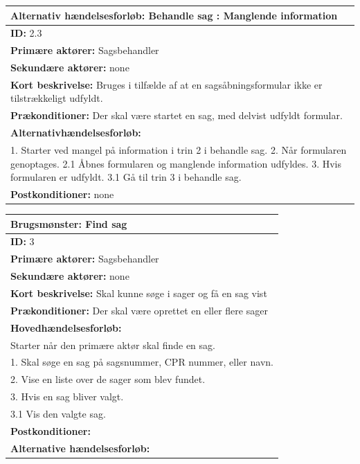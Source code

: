 \begin{center} \label{tab:2.3}
\begin{longtable}{|p{18cm}|}
\hline
\textbf{Alternativ hændelsesforløb:} Behandle sag : Manglende information\\
\hline
\textbf{ID:} 2.3 \\
\hline
\textbf{Primære aktører:} Sagsbehandler\\
\hline
\textbf{Sekundære aktører:} none \\
\hline
\textbf{Kort beskrivelse: }Bruges i tilfælde af at en sagsåbningsformular ikke er tilstrækkeligt udfyldt.
\\
\hline
\textbf{Prækonditioner: }Der skal være startet en sag, med delvist udfyldt formular. 
\\
\hline
\textbf{Alternativhændelsesforløb:}\\
1. Starter ved mangel på information i trin 2 i behandle sag.
2. Når formularen genoptages.
2.1 Åbnes formularen og manglende information udfyldes. 
3. Hvis formularen er udfyldt.
3.1 Gå til trin 3 i behandle sag.

\\
\hline
\textbf{Postkonditioner:} none\\
\hline
\end{longtable}
\end{center}

\begin{center} \label{tab:3}
\begin{longtable}{|p{18cm}|}
\hline
\textbf{Brugsmønster: }Find sag \\
\hline
\textbf{ID: }3\\
\hline
\textbf{Primære aktører: }Sagsbehandler\\
\hline
\textbf{Sekundære aktører: }none\\
\hline
\textbf{Kort beskrivelse: }Skal kunne søge i sager og få en sag vist\\
\hline
\textbf{Prækonditioner: }Der skal være oprettet en eller flere sager\\
\hline
\textbf{Hovedhændelsesforløb: }\\
Starter når den primære aktør skal finde en sag.\\
1. Skal søge en sag på sagsnummer, CPR nummer, eller navn.\\
2. Vise en liste over de sager som blev fundet.\\
3. Hvis en sag bliver valgt.\\
3.1 Vis den valgte sag.\\
\hline
\textbf{Postkonditioner: }\\
\hline
\textbf{Alternative hændelsesforløb: }\\
\hline
\end{longtable}
\end{center}

